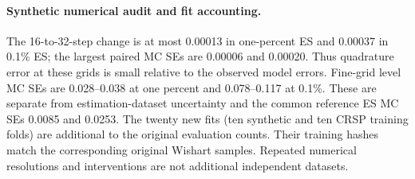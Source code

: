 \documentclass[11pt]{article}
\theoremstyle{definition}\newtheorem{definition}[theorem]{Definition}
\theoremstyle{remark}\newtheorem{remark}[theorem]{Remark}
\begin{document}
\paragraph{Synthetic numerical audit and fit accounting.}

The 16-to-32-step change is at most 0.00013 in one-percent ES and 0.00037 in 0.1\% ES; the largest paired MC SEs are 0.00006 and 0.00020. Thus quadrature error at these grids is small relative to the observed model errors. Fine-grid level MC SEs are 0.028--0.038 at one percent and 0.078--0.117 at 0.1\%. These are separate from estimation-dataset uncertainty and the common reference ES MC SEs 0.0085 and 0.0253. The twenty new fits (ten synthetic and ten CRSP training folds) are additional to the original evaluation counts. Their training hashes match the corresponding original Wishart samples. Repeated numerical resolutions and interventions are not additional independent datasets.
\end{document}
